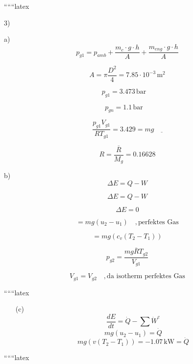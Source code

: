 
``````latex


3)

a) 
\[
p_{g1} = p_{amb} + \frac{m_c \cdot g \cdot h}{A} + \frac{m_{eng} \cdot g \cdot h}{A}
\]

\[
A = \pi \frac{D^2}{4} = 7.85 \cdot 10^{-3} \, \text{m}^2
\]

\[
p_{g1} = 3.473 \, \text{bar} \quad \boxed{}
\]

\[
p_{gn} = 1.1 \, \text{bar} \quad \boxed{}
\]

\[
\frac{p_{g1} V_{g1}}{R T_{g1}} = 3.429 = mg \quad \underline{}
\]

\[
R = \frac{\bar{R}}{M_g} = 0.16628
\]

b) 
\[
\Delta E = Q - W
\]

\[
\Delta E = Q - W
\]

\[
\Delta E = 0
\]

\[
= mg (u_2 - u_1) \quad , \text{perfektes Gas}
\]

\[
= mg (c_v (T_2 - T_1))
\]

\[
p_{g2} = \frac{mg \bar{R} T_{g2}}{V_{g1}}
\]

\[
V_{g1} = V_{g2} \quad , \text{da isotherm perfektes Gas}
\]

``````latex


\begin{itemize}
    \item[(c)] 
    \begin{equation*}
        \frac{dE}{dt} = \dot{Q} - \sum \dot{W}^c
    \end{equation*}
    \begin{equation*}
        mg(u_2 - u_1) = \dot{Q}
    \end{equation*}
    \begin{equation*}
        mg(v(T_2 - T_1)) = \boxed{-1.07 \, \text{kW} = \dot{Q}}
    \end{equation*}
\end{itemize}

``````latex


